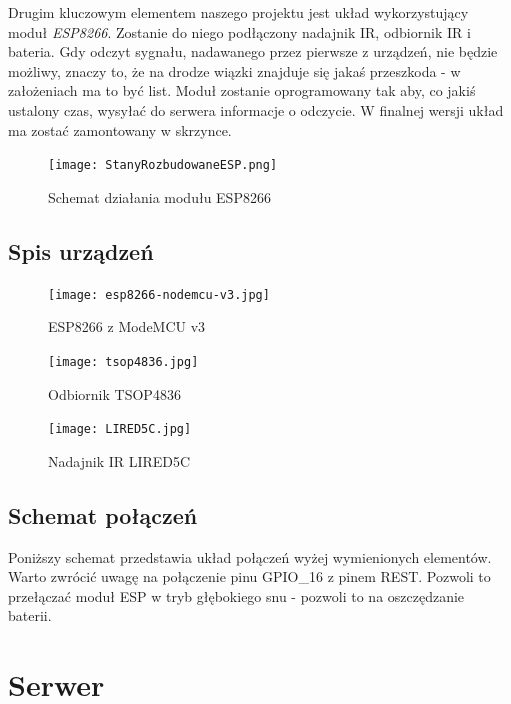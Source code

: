 Drugim kluczowym elementem naszego projektu jest układ wykorzystujący moduł \emph{ESP8266}. Zostanie do niego podłączony nadajnik IR, odbiornik IR i bateria. Gdy odczyt sygnału, nadawanego przez pierwsze z urządzeń, nie będzie możliwy, znaczy to, że na drodze wiązki znajduje się jakaś przeszkoda - w założeniach ma to być list. Moduł zostanie oprogramowany tak aby, co jakiś ustalony czas, wysyłać do serwera informacje o odczycie. W finalnej wersji układ ma zostać zamontowany w skrzynce.

\begin{figure}[H]
	\centering
	\texttt{[image: StanyRozbudowaneESP.png]}
	\caption{Schemat działania modułu ESP8266}
\end{figure}

\subsection{Spis urządzeń}



	\begin{figure}[H]
	\centering
	\texttt{[image: esp8266-nodemcu-v3.jpg]}
	\caption{ESP8266 z ModeMCU v3}
	\end{figure}
	
	\begin{figure}[H]
	\centering
	\texttt{[image: tsop4836.jpg]}
	\caption{Odbiornik TSOP4836 }
	\end{figure}
	
	
	\begin{figure}[H]
	\centering
	\texttt{[image: LIRED5C.jpg]}
	\caption{Nadajnik IR LIRED5C}
	\end{figure}

\subsection{Schemat połączeń}

Poniższy schemat przedstawia układ połączeń wyżej wymienionych elementów. Warto zwrócić uwagę na połączenie pinu GPIO\_16 z pinem REST. Pozwoli to przełączać moduł ESP w tryb głębokiego snu - pozwoli to na oszczędzanie baterii.

\begin{center}
\end{center}

\section{Serwer}

